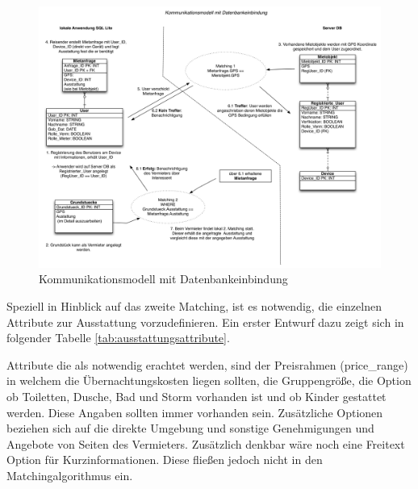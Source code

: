 \begin{figure}[H]
\includegraphics[width=1\textwidth]{./images/kommunikationsmodell_mit_datenbank.png}
\caption{Kommunikationsmodell mit Datenbankeinbindung}
\label{fig:kommunikationsablauf}
\end{figure}

Speziell in Hinblick auf das zweite Matching, ist es notwendig, die einzelnen Attribute zur Ausstattung vorzudefinieren. Ein erster Entwurf dazu zeigt sich in folgender Tabelle \ref{tab:ausstattungsattribute}.

Attribute die als notwendig erachtet werden, sind der Preisrahmen (price\_range) in welchem die Übernachtungskosten liegen sollten, die Gruppengröße, die Option ob Toiletten, Dusche, Bad und Storm vorhanden ist und ob Kinder gestattet werden. Diese Angaben sollten immer vorhanden sein. 
Zusätzliche Optionen beziehen sich auf die direkte Umgebung und sonstige Genehmigungen und Angebote von Seiten des Vermieters. Zusätzlich denkbar wäre noch eine Freitext Option für Kurzinformationen. Diese fließen jedoch nicht in den Matchingalgorithmus ein.


